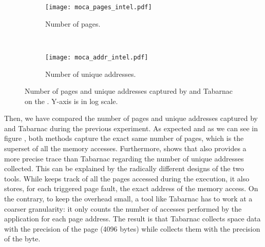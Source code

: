\begin{figure*}[htb]
    \centering
    \begin{subfigure}{.49\linewidth}
        \texttt{[image: moca\_pages\_intel.pdf]}
        \caption{Number of pages.}
        \label{fig:pages}
    \end{subfigure}
    ~
    \begin{subfigure}{.49\linewidth}
        \texttt{[image: moca\_addr\_intel.pdf]}
        \caption{Number of unique addresses.}
        \label{fig:addr}
    \end{subfigure}
    \caption{Number of pages and unique addresses captured by \Moca and Tabarnac
    on the \NPB. Y-axis is in log scale.}
    \label{fig:pages-addr}
\end{figure*}


Then, we have compared the number of pages and unique addresses captured by \Moca
and Tabarnac during the previous experiment. As expected and as we can see in figure
, both methods capture the exact same number of
pages, which is the superset of all the memory accesses. Furthermore,
 shows that \Moca also provides a more precise trace than Tabarnac
regarding the number of unique addresses collected. This can be explained by the 
radically different designs of the two tools. While \Moca keeps track of all
the pages accessed during the execution, it also stores, for each triggered page fault, the
exact address of the memory access. On the contrary, to keep the overhead small,
a tool like Tabarnac has to work at a coarser granularity: it only counts the number
of accesses performed by the application for each page address. The result is that Tabarnac
collects space data with the precision of the page (4096 bytes) while \Moca collects them with
the precision of the byte.


